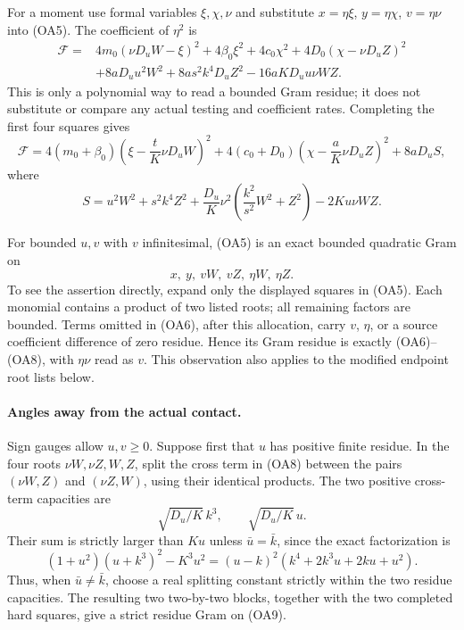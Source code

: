 For a moment use formal variables $\xi,\chi,\nu$ and substitute
$x=\eta\xi$, $y=\eta\chi$, $v=\eta\nu$ into (OA5).
The coefficient of $\eta^2$ is
\begin{align*}
 \mathcal F={}&4m_0(\nu D_uW-\xi)^2+4\beta_0\xi^2
       +4c_0\chi^2+4D_0(\chi-\nu D_uZ)^2\\
 &+8aD_uu^2W^2+8as^2k^4D_uZ^2
       -16aKD_uu\nu WZ.
                                                        \tag{OA6}
\end{align*}
This is only a polynomial way to read a bounded Gram residue; it does
not substitute or compare any actual testing and coefficient rates.
Completing the first four squares gives
\[
 \mathcal F=4(m_0+\beta_0)
  \left(\xi-\frac tK\nu D_uW\right)^2
 +4(c_0+D_0)\left(\chi-\frac aK\nu D_uZ\right)^2
 +8aD_uS,                                               \tag{OA7}
\]
where
\[
 S=u^2W^2+s^2k^4Z^2+
   \frac{D_u}{K}\nu^2\left(\frac{k^2}{s^2}W^2+Z^2\right)
   -2Ku\nu WZ.                                         \tag{OA8}
\]

For bounded $u,v$ with $v$ infinitesimal, (OA5) is an exact bounded
quadratic Gram on
\[
                 x,\ y,\ vW,\ vZ,\ \eta W,\ \eta Z.    \tag{OA9}
\]
To see the assertion directly, expand only the displayed squares in
(OA5). Each monomial contains a product of two listed roots; all
remaining factors are bounded. Terms omitted in (OA6), after this
allocation, carry $v$, $\eta$, or a source coefficient difference of
zero residue. Hence its Gram residue is exactly (OA6)--(OA8), with
$\eta\nu$ read as $v$. This observation also applies to the modified
endpoint root lists below.

\paragraph{Angles away from the actual contact.}
Sign gauges allow $u,v\geq0$. Suppose first that $u$ has positive
finite residue. In the four roots
$\nu W,\nu Z,W,Z$, split the cross term in (OA8) between the pairs
$(\nu W,Z)$ and $(\nu Z,W)$, using their identical products.
The two positive cross-term capacities are
\[
 \sqrt{D_u/K}\,k^3,\qquad \sqrt{D_u/K}\,u.
\]
Their sum is strictly larger than $Ku$ unless $\bar u=\bar k$, since
the exact factorization is
\[
 (1+u^2)(u+k^3)^2-K^3u^2
  =(u-k)^2(k^4+2k^3u+2ku+u^2).                         \tag{OA10}
\]
Thus, when $\bar u\ne\bar k$, choose a real splitting constant
strictly within the two residue capacities. The resulting two
two-by-two blocks, together with the two completed hard squares,
give a strict residue Gram on (OA9).

